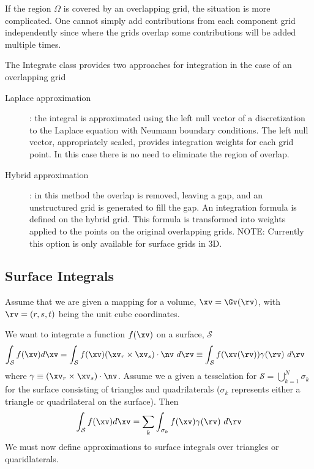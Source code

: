 If the region $\Omega$ is covered by an overlapping grid, the situation is more complicated.
One cannot simply add contributions from each component grid independently since where the grids
overlap some contributions will be added multiple times.

The Integrate class provides two approaches for integration in the case of an overlapping grid
\begin{description}
  \item[Laplace approximation] : the integral is approximated using the left null vector
     of a discretization to the Laplace equation with Neumann boundary conditions. The left null vector,
    appropriately scaled, provides integration weights for each grid point. In this case there is no need
    to eliminate the region of overlap.
  \item[Hybrid approximation] : in this method the overlap is removed, leaving a gap, and an unstructured grid
     is generated to fill the gap. An integration formula is defined on the hybrid grid. This formula
     is transformed into weights applied to the points on the original overlapping grids. NOTE: Currently this
    option is only available for surface grids in 3D.
\end{description}


\newcommand{\Sc}{\mathcal{S}}
\subsection{Surface Integrals}

Assume that we are given a mapping for a volume, $\xv=\Gv(\rv)$, with $\rv=(r,s,t)$ being the 
unit cube coordinates.

We want to integrate a function $f(\xv)$ on a surface, $\Sc$
\begin{align*}
  \int_\Sc f(\xv) d\xv  &= \int_\Sc f(\xv) (\xv_r\times\xv_s)\cdot \nv ~d\rv 
         \equiv \int_\Sc f(\xv(\rv)) \gamma(\rv) ~d\rv
\end{align*}
where $\gamma\equiv(\xv_r\times\xv_s)\cdot \nv$.
Assume we a given a tesselation for $\Sc = \bigcup_{k=1}^N \sigma_k$  
for the surface consisting of triangles and quadrilaterals ($\sigma_k$ represents either a triangle
or quadrilateral on the surface).
Then
\begin{align*}
  \int_\Sc f(\xv) d\xv  &= \sum_k \int_{\sigma_k} f(\xv) \gamma(\rv) ~d\rv \\
\end{align*}
We must now define approximations to surface integrals over triangles or quaridlaterals. 

